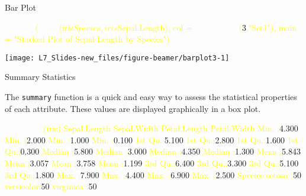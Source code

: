 \documentclass[ignorenonframetext,]{beamer}
\newenvironment{Shaded}{\begin{snugshade}}{\end{snugshade}}
\newcommand{\KeywordTok}[1]{\textcolor{white}{\textbf{{#1}}}}
\newcommand{\NormalTok}[1]{\textcolor{yellow}{{#1}}}
\newcommand{\DataTypeTok}[1]{\textcolor{yellow}{{#1}}}
\newcommand{\DecValTok}[1]{\textcolor{numbercolor}{{#1}}}
\newcommand{\FloatTok}[1]{\textcolor{numbercolor}{{#1}}}
\newcommand{\StringTok}[1]{\textcolor{yellow}{{#1}}}
\begin{document}
\begin{frame}[fragile]{Bar Plot}

\small

\begin{Shaded}
\begin{Highlighting}[]
\KeywordTok{barplot}\NormalTok{(}\KeywordTok{table}\NormalTok{(iris$Species,iris$Sepal.Length), }
        \DataTypeTok{col  =} \KeywordTok{brewer.pal}\NormalTok{(}\DecValTok{3}\NormalTok{,}\StringTok{"Set1"}\NormalTok{), }
        \DataTypeTok{main =} \StringTok{"Stacked Plot of Sepal Length by Species"}\NormalTok{)}
\end{Highlighting}
\end{Shaded}

\begin{center}\texttt{[image: L7\_Slides-new\_files/figure-beamer/barplot3-1]} \end{center}

\end{frame}

\begin{frame}[fragile]{Summary Statistics}

The \texttt{summary} function is a quick and easy way to assess the
statistical properties of each attribute. These values are displayed
graphically in a box plot.

\small

\begin{Shaded}
\begin{Highlighting}[]
\KeywordTok{summary}\NormalTok{(iris)}
  \NormalTok{Sepal.Length    Sepal.Width     Petal.Length    Petal.Width   }
 \NormalTok{Min.   :}\FloatTok{4.300}   \NormalTok{Min.   :}\FloatTok{2.000}   \NormalTok{Min.   :}\FloatTok{1.000}   \NormalTok{Min.   :}\FloatTok{0.100}  
 \NormalTok{1st Qu.:}\FloatTok{5.100}   \NormalTok{1st Qu.:}\FloatTok{2.800}   \NormalTok{1st Qu.:}\FloatTok{1.600}   \NormalTok{1st Qu.:}\FloatTok{0.300}  
 \NormalTok{Median :}\FloatTok{5.800}   \NormalTok{Median :}\FloatTok{3.000}   \NormalTok{Median :}\FloatTok{4.350}   \NormalTok{Median :}\FloatTok{1.300}  
 \NormalTok{Mean   :}\FloatTok{5.843}   \NormalTok{Mean   :}\FloatTok{3.057}   \NormalTok{Mean   :}\FloatTok{3.758}   \NormalTok{Mean   :}\FloatTok{1.199}  
 \NormalTok{3rd Qu.:}\FloatTok{6.400}   \NormalTok{3rd Qu.:}\FloatTok{3.300}   \NormalTok{3rd Qu.:}\FloatTok{5.100}   \NormalTok{3rd Qu.:}\FloatTok{1.800}  
 \NormalTok{Max.   :}\FloatTok{7.900}   \NormalTok{Max.   :}\FloatTok{4.400}   \NormalTok{Max.   :}\FloatTok{6.900}   \NormalTok{Max.   :}\FloatTok{2.500}  
       \NormalTok{Species  }
 \NormalTok{setosa    :}\DecValTok{50}  
 \NormalTok{versicolor:}\DecValTok{50}  
 \NormalTok{virginica :}\DecValTok{50}  
                
                
                
\end{Highlighting}
\end{Shaded}

\end{frame}
\end{document}

